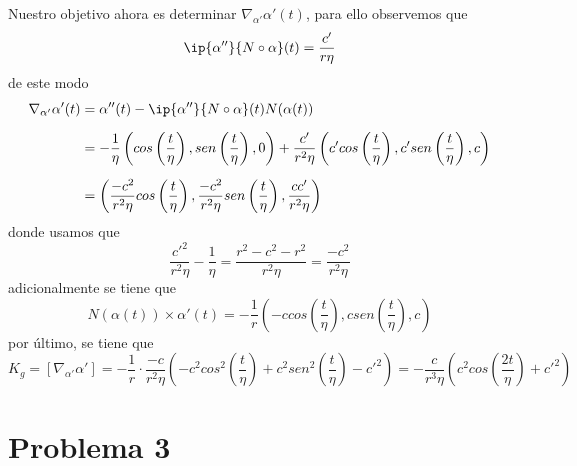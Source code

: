 \documentclass{article}
\begin{document}
Nuestro objetivo ahora es determinar $\nabla_{\alpha'}\alpha'(t)$, para ello observemos que
\begin{equation*}
    \ip{\alpha''}{N\circ\alpha}(t)=\frac{c'}{r\eta}
\end{equation*}
de este modo
\begin{align*}
    \nabla_{\alpha'}\alpha'(t) &= \alpha''(t)-\ip{\alpha''}{N\circ\alpha}(t)N(\alpha(t)) \\[2mm]
    &= -\frac{1}{\eta}\left(cos\left(\frac{t}{\eta}\right),
    sen\left(\frac{t}{\eta}\right),0\right)+\frac{c'}{r^{2}\eta}
    \left(c'cos\left(\frac{t}{\eta}\right),c'sen\left(\frac{t}{\eta}\right),c\right) \\[2mm]
    &= \left(\frac{-c^{2}}{r^{2}\eta}cos\left(\frac{t}{\eta}\right),
    \frac{-c^{2}}{r^{2}\eta}sen\left(\frac{t}{\eta}\right),\frac{cc'}{r^{2}\eta}\right)
\end{align*}
donde usamos que
\begin{equation*}
    \frac{c'^{2}}{r^{2}\eta}-\frac{1}{\eta}=\frac{r^{2}-c^{2}-r^{2}}{r^{2}\eta}
    =\frac{-c^{2}}{r^{2}\eta}
\end{equation*}
adicionalmente se tiene que
\begin{equation*}
    N(\alpha(t))\times\alpha'(t)=-\frac{1}{r}\left(-ccos\left(\frac{t}{\eta}\right),
    csen\left(\frac{t}{\eta}\right),c\right)
\end{equation*}
por último, se tiene que
\begin{equation*}
    K_{g}=[\nabla_{\alpha'}\alpha']=-\frac{1}{r}\cdot\frac{-c}{r^{2}\eta}
    \left(-c^{2}cos^{2}\left(\frac{t}{\eta}\right)+c^{2}sen^{2}\left(\frac{t}{\eta}\right)-c'^{2}
    \right)
    =-\frac{c}{r^{3}\eta}\left(c^{2}cos\left(\frac{2t}{\eta}\right)+c'^{2}\right)
\end{equation*}

\section*{Problema 3}
\end{document}
